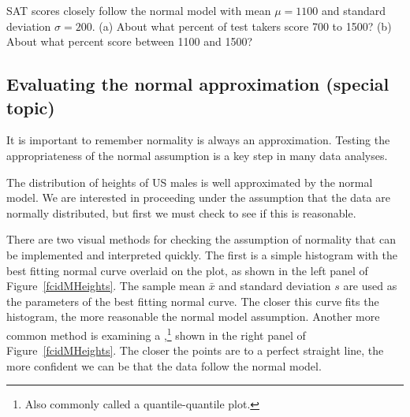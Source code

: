 \begin{exercisewrap}
\begin{nexercise}
SAT scores closely follow the normal model with mean $\mu = 1100$ and standard deviation $\sigma = 200$. (a) About what percent of test takers score 700 to 1500? (b) About what percent score between 1100 and 1500?\footnotemark
\end{nexercise}
\end{exercisewrap}


\D{\newpage}

\subsection{Evaluating the normal approximation (special topic)}
\label{assessingNormal}

It is important to remember normality is always an approximation. Testing the appropriateness of the normal assumption is a key step in many data analyses.


The distribution of heights of US males is well approximated by the normal model. We are interested in proceeding under the assumption that the data are normally distributed, but first we must check to see if this is reasonable.

There are two visual methods for checking the assumption of normality that can be implemented and interpreted quickly. The first is a simple histogram with the best fitting normal curve overlaid on the plot, as shown in the left panel of Figure~\ref{fcidMHeights}. The sample mean $\bar{x}$ and standard deviation $s$ are used as the parameters of the best fitting normal curve. The closer this curve fits the histogram, the more reasonable the normal model assumption. Another more common method is examining a ,\footnote{Also commonly called a quantile-quantile plot.} shown in the right panel of Figure~\ref{fcidMHeights}. The closer the points are to a perfect straight line, the more confident we can be that the data follow the normal model.

